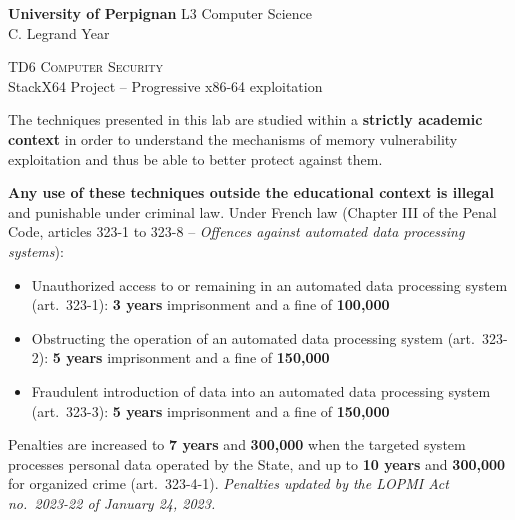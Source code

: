 \documentclass[a4paper,11pt]{article}
\theoremstyle{plain}
\theoremstyle{definition}
\begin{document}
\hbox{}
\noindent \textbf{University of Perpignan} \hfill  L3 Computer Science \\
 \hfill C. Legrand \hfill  Year \the\year  \\
\smallskip
\begin{center}
{
 {\scshape \large TD6 Computer Security}  \\
 StackX64 Project -- Progressive x86-64 exploitation
}
\end{center}
\hbox{}

\bigskip

\begin{ethique}
The techniques presented in this lab are studied within a \textbf{strictly academic context} in order to understand the mechanisms of memory vulnerability exploitation and thus be able to better protect against them.

\textbf{Any use of these techniques outside the educational context is illegal} and punishable under criminal law. Under French law (Chapter III of the Penal Code, articles 323-1 to 323-8 -- \textit{Offences against automated data processing systems}):
\begin{itemize}
    \item Unauthorized access to or remaining in an automated data processing system (art.~323-1): \textbf{3 years} imprisonment and a fine of \textbf{\texteuro{}100,000}
    \item Obstructing the operation of an automated data processing system (art.~323-2): \textbf{5 years} imprisonment and a fine of \textbf{\texteuro{}150,000}
    \item Fraudulent introduction of data into an automated data processing system (art.~323-3): \textbf{5 years} imprisonment and a fine of \textbf{\texteuro{}150,000}
\end{itemize}
Penalties are increased to \textbf{7 years} and \textbf{\texteuro{}300,000} when the targeted system processes personal data operated by the State, and up to \textbf{10 years} and \textbf{\texteuro{}300,000} for organized crime (art.~323-4-1). \textit{Penalties updated by the LOPMI Act no.~2023-22 of January 24, 2023.}
\end{ethique}

\bigskip

\end{document}
